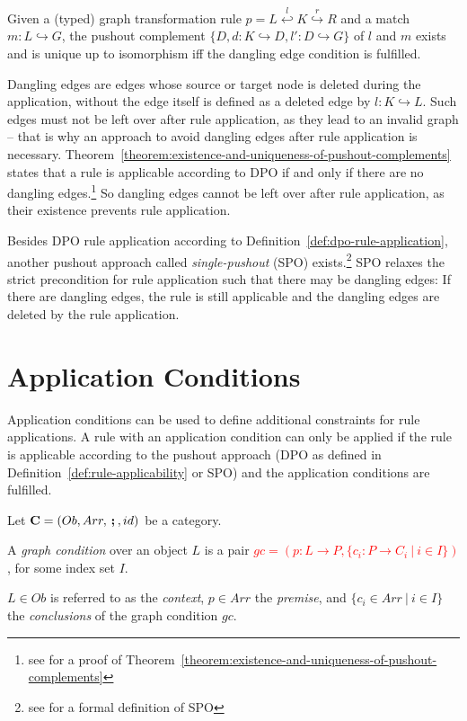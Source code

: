 \begin{theorem}
	\label{theorem:existence-and-uniqueness-of-pushout-complements}%
	Given a (typed) graph transformation rule $p = L \stackrel{l}{\hookleftarrow} K \stackrel{r}{\hookrightarrow} R$ and a match $m: L \hookrightarrow G$, the pushout complement $\{D, d: K \hookrightarrow D, l': D \hookrightarrow G\}$ of $l$ and $m$ exists and is unique up to isomorphism iff the dangling edge condition is fulfilled.  
\end{theorem}

\noindent
Dangling edges are edges whose source or target node is deleted during the application, without the edge itself is defined as a deleted edge by $l: K \hookrightarrow L$.
Such edges must not be left over after rule application, as they lead to an invalid graph -- that is why an approach to avoid dangling edges after rule application is necessary.
Theorem~\ref{theorem:existence-and-uniqueness-of-pushout-complements} states that a rule is applicable according to DPO if and only if there are no dangling edges.\footnote{see \cite[Fact 3.11, pp. 45-46]{FundamentalsOfAlgebraicGT} for a proof of Theorem~\ref{theorem:existence-and-uniqueness-of-pushout-complements}}
So dangling edges cannot be left over after rule application, as their existence prevents rule application.

Besides DPO rule application according to Definition~\ref{def:dpo-rule-application}, another pushout approach called \textit{single-pushout} (SPO) exists.\footnote{see \cite{HandbookOfGraphGrammars1997} for a formal definition of SPO}
SPO relaxes the strict precondition for rule application such that there may be dangling edges:
If there are dangling edges, the rule is still applicable and the dangling edges are deleted by the rule application.

\section{Application Conditions}
\label{fundamentals-application-conditions}
Application conditions can be used to define additional constraints for rule applications.
A rule with an application condition can only be applied if the rule is applicable according to the pushout approach (DPO as defined in Definition~\ref{def:rule-applicability} or SPO) and the application conditions are fulfilled.

\begin{definition}
	\label{def:graph-conditions}%
	Let  $\mathbf{C} = (Ob, Arr, \textbf{\,;\,}, id)$ be a category.

	\gap
	A \emph{graph condition} over an object $L$ is a pair 
	\textcolor{red}{$gc = (p: L \rightarrow P, \{ c_i: P \rightarrow C_i ~|~ i \in I \})$}, for some index set $I$.

	\gap
	$L \in Ob$ is referred to as the \emph{context}, $p \in Arr$ the \emph{premise}, and $\{ c_i \in Arr ~|~ i \in I \}$ the \emph{conclusions} of the graph condition $gc$.  
\end{definition}

